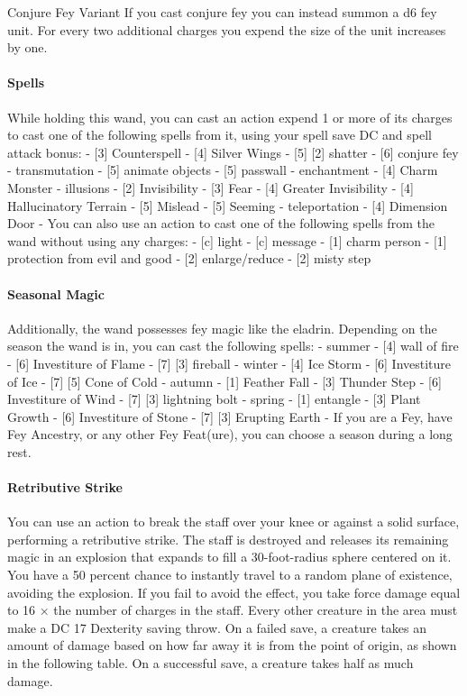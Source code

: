 \documentclass[letter,10pt,twocolumn,openany]{dndbook}
\begin{document}
\begin{DndComment}{Conjure Fey Variant}
    If you cast conjure fey you can instead summon a d6 fey unit.
    For every two additional charges you expend the size of the unit increases by one.
\end{DndComment}

\paragraph{Spells}
  While holding this wand, you can cast an action expend 1 or more of its charges to cast one of the following spells from it, using your spell save DC and spell attack bonus:
  - [3] Counterspell
  - [4] Silver Wings
  - [5] [2] shatter
  - [6] conjure fey
  - transmutation
    - [5] animate objects
    - [5] passwall
  - enchantment
    - [4] Charm Monster
  - illusions
    - [2] Invisibility
    - [3] Fear
    - [4] Greater Invisibility
    - [4] Hallucinatory Terrain
    - [5] Mislead
    - [5] Seeming
  - teleportation
    - [4] Dimension Door
- You can also use an action to cast one of the following spells from the wand without using any charges:
  - [c] light
  - [c] message
  - [1] charm person
  - [1] protection from evil and good
  - [2] enlarge/reduce
  - [2] misty step

\paragraph{Seasonal Magic}
  Additionally, the wand possesses fey magic like the eladrin.
  Depending on the season the wand is in, you can cast the following spells:
  - summer
    - [4] wall of fire
    - [6] Investiture of Flame
    - [7] [3] fireball
  - winter
    - [4] Ice Storm
    - [6] Investiture of Ice
    - [7] [5] Cone of Cold
  - autumn
    - [1] Feather Fall
    - [3] Thunder Step
    - [6] Investiture of Wind
    - [7] [3] lightning bolt
  - spring
    - [1] entangle
    - [3] Plant Growth
    - [6] Investiture of Stone
    - [7] [3] Erupting Earth
- If you are a Fey, have Fey Ancestry, or any other Fey Feat(ure), you can choose a season during a long rest.

\paragraph{Retributive Strike}
    You can use an action to break the staff over your knee or against a solid surface, performing a retributive strike. The staff is destroyed and releases its remaining magic in an explosion that expands to fill a 30-foot-radius sphere centered on it.
    You have a 50 percent chance to instantly travel to a random plane of existence, avoiding the explosion. If you fail to avoid the effect, you take force damage equal to 16 × the number of charges in the staff. Every other creature in the area must make a DC 17 Dexterity saving throw. On a failed save, a creature takes an amount of damage based on how far away it is from the point of origin, as shown in the following table. On a successful save, a creature takes half as much damage.
\end{document}
